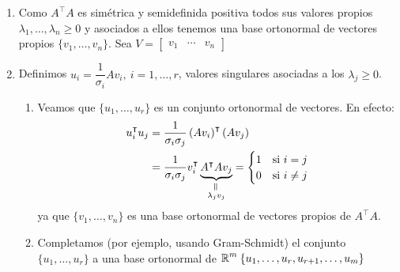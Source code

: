 \begin{enumerate}[label=\color{lightblue}\underline{Paso \arabic*:}]
	\item Como $A^\intercal A$ es simétrica y semidefinida positiva todos sus valores propios $\lambda_1,\dots,\lambda_n\ge0$ y asociados a ellos tenemos una base ortonormal de vectores propios $\{v_1,\dots,v_n\}$. Sea $V=\begin{bmatrix}
		v_1 & \cdots & v_n
	\end{bmatrix}$
	\item Definimos $u_i=\dfrac{1}{\sigma_i}Av_i,\:i=1,\dots,r$, valores singulares asociadas a los $\lambda_j\ge0$.
	\begin{enumerate}[label=\color{lightblue}2.\arabic*)]
		\item Veamos que $\{u_1,\dots,u_r\}$ es un conjunto ortonormal de vectores. En efecto: \[ \begin{aligned}
			u_i^\intercal u_j&=\dfrac{1}{\sigma_i\sigma_j}\left(Av_i\right)^\intercal(Av_j)\\
			&=\dfrac{1}{\sigma_i\sigma_j}v_i^\intercal\underbrace{A^\intercal Av_j}_{\begin{subarray}{c}
					\rotatebox{90}{=}\\
					\lambda_jv_j
			\end{subarray}}=\begin{cases}
				1 & \text{si }i=j\\
				0 & \text{si }i\neq j
			\end{cases}
		\end{aligned} \]ya que $\{v_1,\dots,v_n\}$ es una base ortonormal de vectores propios de $A^\intercal A$.
		\item Completamos (por ejemplo, usando Gram-Schmidt) el conjunto $\{u_1,\dots,u_r\}$ a una base ortonormal de $\operatorname{\mathbb{R}}^m\:\{u_1,\dots,u_r,u_{r+1},\dots,u_m\}$
		

\end{enumerate}
\end{enumerate}
